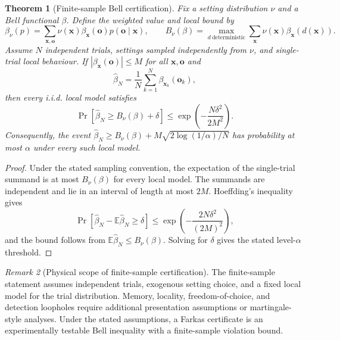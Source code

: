 \documentclass[11pt]{article}
\theoremstyle{plain}
\newtheorem{theorem}{Theorem}[section]
\theoremstyle{definition}
\theoremstyle{remark}
\newtheorem{remark}[theorem]{Remark}
\begin{document}
\begin{theorem}[Finite-sample Bell certification]
\label{thm:finite-sample-bell}
Fix a setting distribution \(\nu\) and a Bell functional \(\beta\). Define the
weighted value and local bound by
\[
\beta_\nu(p)=
\sum_{\mathbf x,
\mathbf o}
\nu(\mathbf x)\beta_{\mathbf x}(\mathbf o)p(\mathbf o\mid\mathbf x),
\qquad
B_\nu(\beta)=
\max_{d\ \mathrm{deterministic}}
\sum_{\mathbf x}
\nu(\mathbf x)\beta_{\mathbf x}(d(\mathbf x)).
\]
Assume \(N\) independent trials, settings sampled independently from \(\nu\), and
single-trial local behaviour. If \(|\beta_{\mathbf x}(\mathbf o)|\le M\) for all \(\mathbf x,\mathbf o\) and
\[
\widehat\beta_N=\frac1N\sum_{k=1}^N
\beta_{\mathbf x_k}(\mathbf o_k),
\]
then every i.i.d. local model satisfies
\[
\Pr\!\left[
\widehat\beta_N\ge B_\nu(\beta)+\delta
\right]
\le
\exp\!\left(-\frac{N\delta^2}{2M^2}\right).
\]
Consequently, the event
\(\widehat\beta_N\ge B_\nu(\beta)+M\sqrt{2\log(1/\alpha)/N}\) has probability at
most \(\alpha\) under every such local model.
\end{theorem}

\begin{proof}
Under the stated sampling convention, the expectation of the single-trial
summand is at most \(B_\nu(\beta)\) for every local model. The summands are
independent and lie in an interval of length at most \(2M\). Hoeffding's
inequality gives
\[
\Pr\!\left[
\widehat\beta_N-\mathbb E\widehat\beta_N\ge\delta
\right]
\le
\exp\!\left(-\frac{2N\delta^2}{(2M)^2}\right),
\]
and the bound follows from \(\mathbb E\widehat\beta_N\le B_\nu(\beta)\). Solving
for \(\delta\) gives the stated level-\(\alpha\) threshold.
\end{proof}

\begin{remark}[Physical scope of finite-sample certification]
The finite-sample statement assumes independent trials, exogenous setting choice,
and a fixed local model for the trial distribution. Memory, locality,
freedom-of-choice, and detection loopholes require additional presentation
assumptions or martingale-style analyses. Under the stated assumptions, a Farkas
certificate is an experimentally testable Bell inequality with a finite-sample
violation bound.
\end{remark}
\end{document}
